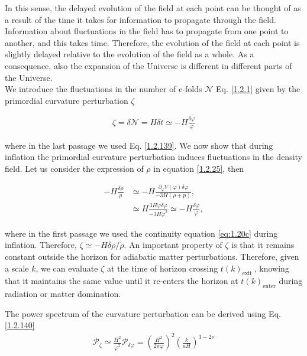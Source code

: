 In this sense, the delayed evolution of the field at each point can be thought of as a result of the time it takes for information to propagate through the field. Information about fluctuations in the field has to propagate from one point to another, and this takes time. Therefore, the evolution of the field at each point is slightly delayed relative to the evolution of the field as a whole. As a consequence, also the expansion of the Universe is different in different parts of the Universe.\\ We introduce the fluctuations in the number of e-folds $\mathcal{N}$ Eq. \eqref{1.2.1} given by the primordial curvature perturbation \(\zeta\)

\begin{align}
    \zeta=\delta \mathcal{N}=H \delta t \simeq-H \frac{\delta \varphi}{\dot{\varphi}}\label{1.2.140}
\end{align}

where in the last passage we used Eq. \eqref{1.2.139}. We now show that during inflation the primordial curvature perturbation induces fluctuations in the density field. Let us consider the expression of $\rho$ in equation \eqref{1.2.25}, then


\begin{align}
    -H \frac{\delta \rho}{\dot{\rho}} & \simeq-H \frac{\partial_{\varphi} V(\varphi) \delta \varphi}{-3 H(\rho+p)}, \\
    & \simeq H \frac{3 H \dot{\varphi} \delta \varphi}{-3 H \dot{\varphi}^{2}} \simeq-H \frac{\delta \varphi}{\dot{\varphi}}, \label{1.2.142}
\end{align}


where in the first passage we used the continuity equation \eqref{eq:1.20c} during inflation. Therefore, $\zeta \simeq-H \delta \rho / \dot{\rho}$. An important property of $\zeta$ is that it remains constant outside the horizon for adiabatic matter perturbations\cite{Bartolo_2004}. Therefore, given a scale $k$, we can evaluate $\zeta$ at the time of horizon crossing $t(k)_{\text {exit }}$, knowing that it maintains the same value until it re-enters the horizon at $t(k)_{\text {enter}}$ during radiation or matter domination.

The power spectrum of the curvature perturbation can be derived using Eq. \eqref{1.2.140}
\begin{align}
    \mathcal{P}_{\zeta} \simeq \frac{H^{2}}{\dot{\varphi}^{2}} \mathcal{P}_{\delta \varphi}=\left(\frac{H^2}{2 \pi \dot{\varphi}}\right)^{2}\left(\frac{k}{a H}\right)^{3-2 \nu} \label{1.2.143}
\end{align}

